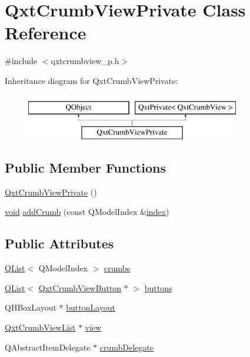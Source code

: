\hypertarget{class_qxt_crumb_view_private}{\section{Qxt\-Crumb\-View\-Private Class Reference}
\label{class_qxt_crumb_view_private}
}


{\ttfamily \#include $<$qxtcrumbview\-\_\-p.\-h$>$}

Inheritance diagram for Qxt\-Crumb\-View\-Private\-:\begin{figure}[H]
\begin{center}
\leavevmode
\includegraphics[height=2.000000cm]{class_qxt_crumb_view_private}
\end{center}
\end{figure}
\subsection*{Public Member Functions}
\begin{DoxyCompactItemize}
\item 
\hyperlink{class_qxt_crumb_view_private_a6496097cfd84e0ed2c7daf38e0d7561b}{Qxt\-Crumb\-View\-Private} ()
\item 
\hyperlink{group___u_a_v_objects_plugin_ga444cf2ff3f0ecbe028adce838d373f5c}{void} \hyperlink{class_qxt_crumb_view_private_a1cd1bdaf46ea9b8a82a5687714a65ce4}{add\-Crumb} (const Q\-Model\-Index \&\hyperlink{glext_8h_ab47dd9958bcadea08866b42bf358e95e}{index})
\end{DoxyCompactItemize}
\subsection*{Public Attributes}
\begin{DoxyCompactItemize}
\item 
\hyperlink{class_q_list}{Q\-List}$<$ Q\-Model\-Index $>$ \hyperlink{class_qxt_crumb_view_private_a5965891608cbf8c274ed31da00945ced}{crumbs}
\item 
\hyperlink{class_q_list}{Q\-List}$<$ \hyperlink{class_qxt_crumb_view_button}{Qxt\-Crumb\-View\-Button} $\ast$ $>$ \hyperlink{class_qxt_crumb_view_private_a99a3d0ca4d38a3e8100c5564daa972c6}{buttons}
\item 
Q\-H\-Box\-Layout $\ast$ \hyperlink{class_qxt_crumb_view_private_a482aef6ef4ce71143140d7dd92284e85}{button\-Layout}
\item 
\hyperlink{class_qxt_crumb_view_list}{Qxt\-Crumb\-View\-List} $\ast$ \hyperlink{class_qxt_crumb_view_private_a536b676a37acf181d5a15525785514b8}{view}
\item 
Q\-Abstract\-Item\-Delegate $\ast$ \hyperlink{class_qxt_crumb_view_private_aa2979d19252f37122f21717a195a20fa}{crumb\-Delegate}
\end{DoxyCompactItemize}
